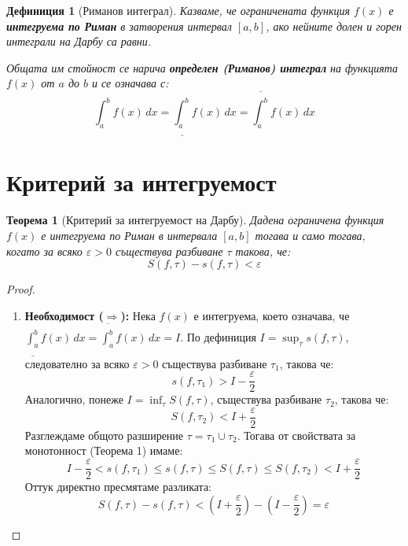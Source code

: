 \documentclass{scrartcl}
\newtheorem{theorem}{Теорема}
\newtheorem{definition}{Дефиниция}
\begin{document}
\begin{FlushLeft}
\begin{definition}[Риманов интеграл]
Казваме, че ограничената функция $f(x)$ е \textbf{интегруема по Риман} в затворения интервал $[a, b]$, ако нейните долен и горен интеграли на Дарбу са равни. 

Общата им стойност се нарича \textbf{определен (Риманов) интеграл} на функцията $f(x)$ от $a$ до $b$ и се означава с:
\[ \int_{a}^{b} f(x)\,dx = \underline{\int_{a}^{b}} f(x)\,dx = \overline{\int_{a}^{b}} f(x)\,dx \]
\end{definition}

\newpage

\section{Критерий за интегруемост}

\begin{theorem}[Критерий за интегруемост на Дарбу]
Дадена ограничена функция $f(x)$ е интегруема по Риман в интервала $[a, b]$ тогава и само тогава, когато за всяко $\varepsilon > 0$ съществува разбиване $\tau$ такова, че:
\[ S(f, \tau) - s(f, \tau) < \varepsilon \]
\end{theorem}

\begin{proof}~
\begin{enumerate}
    \item \textbf{Необходимост ($\Rightarrow$):}
    Нека $f(x)$ е интегруема, което означава, че $\underline{\int_{a}^{b}} f(x)\,dx = \overline{\int_{a}^{b}} f(x)\,dx = I$.
    По дефиниция $I = \sup_\tau s(f, \tau)$, следователно за всяко $\varepsilon > 0$ съществува разбиване $\tau_1$, такова че:
    \[ s(f, \tau_1) > I - \frac{\varepsilon}{2} \]
    Аналогично, понеже $I = \inf_\tau S(f, \tau)$, съществува разбиване $\tau_2$, такова че:
    \[ S(f, \tau_2) < I + \frac{\varepsilon}{2} \]
    Разглеждаме общото разширение $\tau = \tau_1 \cup \tau_2$. Тогава от свойствата за монотонност (Теорема 1) имаме:
    \[ I - \frac{\varepsilon}{2} < s(f, \tau_1) \le s(f, \tau) \le S(f, \tau) \le S(f, \tau_2) < I + \frac{\varepsilon}{2} \]
    Оттук директно пресмятаме разликата:
    \[ S(f, \tau) - s(f, \tau) < \left(I + \frac{\varepsilon}{2}\right) - \left(I - \frac{\varepsilon}{2}\right) = \varepsilon \]
    

\end{enumerate}
\end{proof}
\end{FlushLeft}
\end{document}
